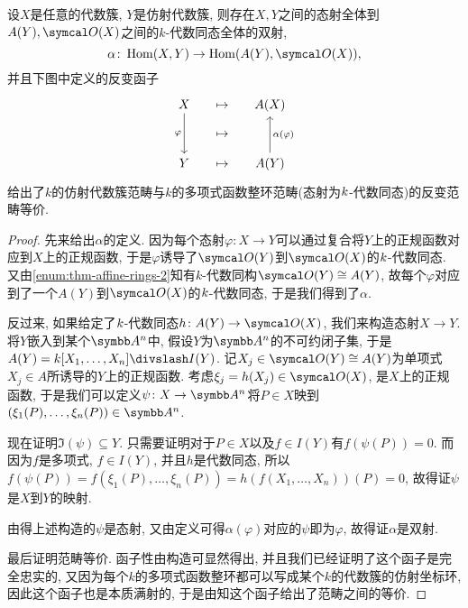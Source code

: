\begin{theorem}\label{thm:categoryisoaffinevariety}
  设$X$是任意的代数簇, $Y$是仿射代数簇, 则存在$X, Y$之间的态射全体到$A(Y), \OO (X)$之间的$k$-代数同态全体的双射,
  \begin{equation*}
    \alpha\colon \Hom (X, Y)\to\Hom (A(Y), \OO (X)),
  \end{equation*}
  并且下图中定义的反变函子
  \begin{equation*}
    \begin{tikzcd}[sep=small]
      X \arrow[dd, "\varphi"'] & \mapsto & A(X)\\
      & \mapsto & \\
      Y & \mapsto & A(Y) \arrow[uu, "\alpha (\varphi)"']
    \end{tikzcd}
  \end{equation*}
  给出了$k$的仿射代数簇范畴与$k$的多项式函数整环范畴(态射为$k$-代数同态)的反变范畴等价.
\end{theorem}

\begin{proof}
  先来给出$\alpha$的定义. 因为每个态射$\varphi\colon X\to Y$可以通过复合将$Y$上的正规函数对应到$X$上的正规函数, 于是$\varphi$诱导了$\OO (Y)$到$\OO (X)$的$k$-代数同态. 又由\ref{enum:thm-affine-rings-2}知有$k$-代数同构$\OO (Y)\cong A(Y)$, 故每个$\varphi$对应到了一个$A(Y)$到$\OO (X)$的$k$-代数同态, 于是我们得到了$\alpha$.

  反过来, 如果给定了$k$-代数同态$h\colon A(Y)\to \OO (X)$, 我们来构造态射$X\to Y$. 将$Y$嵌入到某个$\AF^n$中, 假设$Y$为$\AF^n$的不可约闭子集, 于是$A(Y)=\kk [X_1, \dotsc, X_n]{\divslash} I(Y)$. 记$X_j\in \OO (Y)\cong A(Y)$为单项式$X_j\in A$所诱导的$Y$上的正规函数. 考虑$\xi_j=h(X_j)\in \OO (X)$, 是$X$上的正规函数, 于是我们可以定义$\psi\colon X\to \AF^n$将$P\in X$映到$(\xi_1 (P), \dotsc, \xi_n (P))\in \AF^n$.

  现在证明$\Im (\psi)\subseteq Y$. 只需要证明对于$P\in X$以及$f\in I(Y)$有$f(\psi(P))=0$. 而因为$f$是多项式, $f\in I(Y)$, 并且$h$是代数同态, 所以$f(\psi(P))=f(\xi_1(P), \dotsc, \xi_n(P))=h(f(X_1, \dotsc, X_n))(P)=0$, 故得证$\psi$是$X$到$Y$的映射.

  由得上述构造的$\psi$是态射, 又由定义可得$\alpha(\varphi)$对应的$\psi$即为$\varphi$, 故得证$\alpha$是双射.

  最后证明范畴等价. 函子性由构造可显然得出, 并且我们已经证明了这个函子是完全忠实的, 又因为每个$k$的多项式函数整环都可以写成某个$k$的代数簇的仿射坐标环, 因此这个函子也是本质满射的, 于是由知这个函子给出了范畴之间的等价.
\end{proof}

